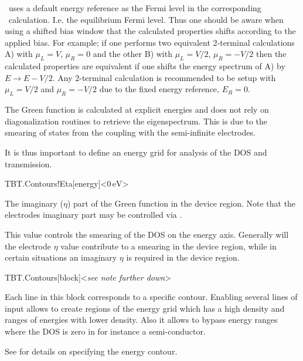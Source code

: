 \tbtrans\ uses a default energy reference as the Fermi level in the
corresponding \tsiesta\ calculation. I.e. the equilibrium Fermi
level. Thus one should be aware when using a shifted bias window that
the calculated properties shifts according to the applied bias. For
example; if one performs two equivalent 2-terminal calculations A)
with $\mu_L=V$, $\mu_R=0$ and the other B) with $\mu_L=V/2$,
$\mu_R=-V/2$ then the calculated properties are equivalent if one
shifts the energy spectrum of A) by $E \to E - V/2$. Any 2-terminal
calculation is recommended to be setup with $\mu_L=V/2$ and
$\mu_R=-V/2$ due to the fixed energy reference, $E_R = 0$.

The Green function is calculated at explicit energies and does not
rely on diagonalization routines to retrieve the eigenspectrum. This
is due to the smearing of states from the coupling with the
semi-infinite electrodes.

It is thus important to define an energy grid for analysis of the DOS
and transmission.

\begin{fdfentry}{TBT.Contours!Eta}[energy]<$0\,\mathrm{eV}$>
  
  The imaginary ($\eta$) part of the Green function in the device
  region. Note that the electrodes imaginary part may be controlled
  via .

  This value controls the smearing of the DOS on the energy
  axis. Generally will the electrode $\eta$ value contribute to a
  smearing in the device region, while in certain situations an
  imaginary $\eta$ is required in the device region. 
  
\end{fdfentry}

\begin{fdfentry}{TBT.Contours}[block]<\emph{see note further down}>

  Each line in this block corresponds to a specific contour.
  Enabling several lines of input allows to create regions of the
  energy grid which has a high density and ranges of energies with
  lower density. Also it allows to bypass energy ranges where the DOS
  is zero in for instance a semi-conductor.  

  See  for details on specifying the energy contour.
  
\end{fdfentry}


